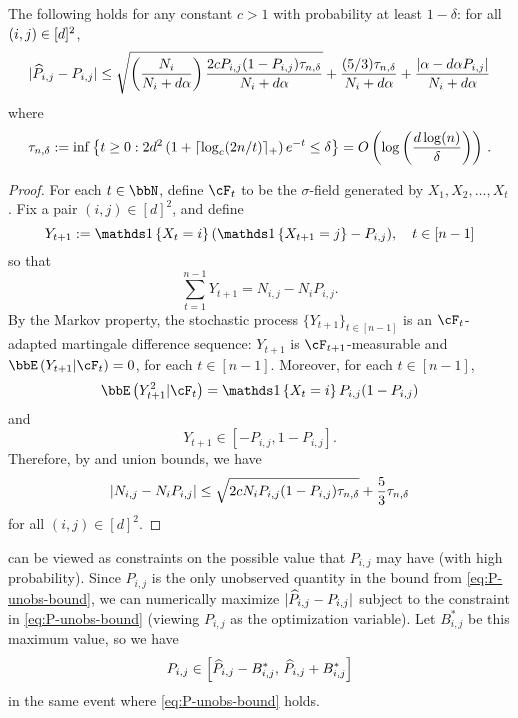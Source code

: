 \begin{lemma}
  \label{lem:P-unobs-bound}
  The following holds for any constant $c>1$ with probability at least
  $1-\delta$: for all $(i,j) \in [d]^2$,
  \begin{equation}
    | \widehat{P}_{i,j} - P_{i,j} |
    \leq
    \sqrt{\left(\frac{N_i}{N_i+d\alpha}\right)\frac{2cP_{i,j}(1-P_{i,j})\tau_{n,\delta}}{N_i+d\alpha}}
    + \frac{(5/3)\tau_{n,\delta}}{N_i+d\alpha}
    + \frac{|\alpha-d\alpha P_{i,j}|}{N_i+d\alpha}
    \label{eq:P-unobs-bound}
  \end{equation}
  where
  \begin{equation}
    \tau_{n,\delta}
    := \inf
    \left\{
      t\geq0 :
      2d^2 \left( 1 + \lceil\log_c(2n/t)\rceil_+ \right) e^{-t} \leq \delta
    \right\}
    = O\left( \log\left( \frac{d\log(n)}{\delta} \right) \right)
    \,.
    \label{eq:emptail}
  \end{equation}
\end{lemma}
\begin{proof}
  For each $t \in \bbN$, define $\cF_t$ to be the $\sigma$-field
  generated by $X_1,X_2,\dotsc,X_t$.
  Fix a pair $(i,j) \in [d]^2$, and define
  \[
    Y_{t+1} := \Ind{X_t = i} (\Ind{X_{t+1}=j} - P_{i,j})
    , \quad t \in [n-1]
  \]
  so that
  \[
    \sum_{t=1}^{n-1} Y_{t+1}
    = N_{i,j} - N_i P_{i,j}
    .
  \]
  By the Markov property, the stochastic process $\{ Y_{t+1} \}_{t \in
  [n-1]}$ is an $\cF_t$-adapted martingale difference sequence:
  $Y_{t+1}$ is $\cF_{t+1}$-measurable and $\EE{Y_{t+1}| \cF_t } = 0$,
  for each $t \in [n-1]$.
  Moreover, for each $t \in [n-1]$,
  \[
    \EE{Y_{t+1}^2| \cF_t } = \Ind{X_t=i} P_{i,j} (1-P_{i,j})
  \]
  and
  \[
    Y_{t+1} \in [-P_{i,j},1-P_{i,j}] .
  \]
  Therefore, by  and union bounds, we have
  \[
    | N_{i,j} - N_i P_{i,j} |
    \leq \sqrt{2c N_i P_{i,j} (1-P_{i,j}) \tau_{n,\delta}} + \frac53
    \tau_{n,\delta}
  \]
  for all $(i,j) \in [d]^2$.
\end{proof}

 can be viewed as constraints on the possible
value that $P_{i,j}$ may have (with high probability).
Since $P_{i,j}$ is the only unobserved quantity in the bound from
\cref{eq:P-unobs-bound}, we can numerically maximize $|\widehat{P}_{i,j} -
P_{i,j}|$ subject to the constraint in \cref{eq:P-unobs-bound}
(viewing $P_{i,j}$ as the optimization variable).
Let $B_{i,j}^*$ be this maximum value, so we have
\[
  P_{i,j} \in
  \left[
    \widehat{P}_{i,j} - B_{i,j}^*,\,
    \widehat{P}_{i,j} + B_{i,j}^*
  \right]
\]
in the same event where \cref{eq:P-unobs-bound} holds.

